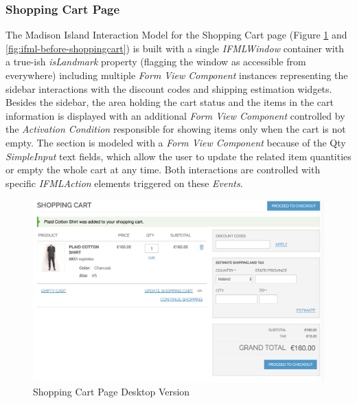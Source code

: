 \newpage
\subsubsection{Shopping Cart Page}
\label{shopping-cart-page-overview}
The Madison Island Interaction Model for the Shopping Cart page (Figure \ref{fig:desktop-before-shoppingcart} and \ref{fig:ifml-before-shoppingcart}) is  built with a single \textit{IFMLWindow} container with a true-ish \textit{isLandmark} property (flagging the window as accessible from everywhere) including multiple \textit{Form View Component} instances representing the sidebar interactions with the discount codes and shipping estimation widgets. Besides the sidebar, the area holding the cart status and the items in the cart information is displayed with an additional \textit{Form View Component} controlled by the \textit{Activation Condition} responsible for showing items only when the cart is not empty. The section is modeled with a \textit{Form View Component} because of the Qty \textit{SimpleInput} text fields, which allow the user to update the related item quantities or empty the whole cart at any time. Both interactions are controlled with specific \textit{IFMLAction} elements triggered on these \textit{Events}.

\vspace{0.5cm}
\begin{figure}[H]
  \centering
    \includegraphics[width=14cm]{images/diagrams/before/desktop-shoppingcart.png}
  \caption{Shopping Cart Page Desktop Version}
  \label{fig:desktop-before-shoppingcart}
\end{figure}

